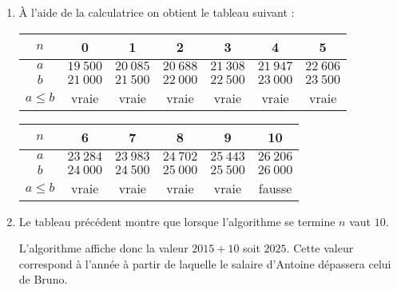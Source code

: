 \begin{corrige}
     \par
     \par
     \begin{enumerate}
          \item \`A l'aide de la calculatrice on obtient le tableau suivant :
          \par
          \begin{tabular}{|c|c|c|c|c|c|c|}\hline  %
               $n$	& 0	&	1 &	2 &	3 &	4 &	5  \\ \hline
               $a$	& $19\ 500$	& $20\ 085$  	& $20\ 688$  	&$21\ 308$  	& $21\ 947$  	& $22\ 606$   \\ \hline
               $b$	& $21\ 000$	& $21\ 500$  	& $22\ 000$  	& $22\ 500$  	& $23\ 000$  	& $23\ 500$ 	\\ \hline
               $a \leqslant  b$	& vraie	& 	vraie	& vraie	& vraie	& vraie	& vraie	 \\ \hline
          \end{tabular}
          \par
          \begin{tabular}{|c|c|c|c|c|c|}\hline %
               $n$	& 6 &	7 &	8 &	9 &	10 \\ \hline
               $a$	& $23\ 284$  	& $23\ 983$  	& $24\ 702$  	& $25\ 443$  	& $26\ 206$  	\\ \hline
               $b$	& $24\ 000$  	& $24\ 500$  	& $25\ 000$  	& $25\ 500$  	& $26\ 000$  	\\ \hline
               $a \leqslant  b$	& vraie	& vraie	& vraie	& vraie	& fausse	  \\ \hline
          \end{tabular}
          \par
          \par
          \item Le tableau précédent montre que lorsque l'algorithme se termine $n$ vaut $10$.
          \par
          L'algorithme affiche donc la valeur ${2015+10}$ soit $2025$. Cette valeur correspond à l'année à partir de laquelle le salaire d'Antoine dépassera celui de Bruno.
     \end{enumerate}
\end{corrige}
